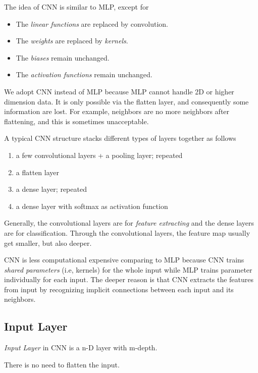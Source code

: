 \documentclass{note}
\begin{document}
The idea of CNN is similar to MLP, except for
\begin{itemize}
    \item The \textit{linear functions} are replaced by convolution.
    \item The \textit{weights} are replaced by \textit{kernels}.
    \item The \textit{biases} remain unchanged.
    \item The \textit{activation functions} remain unchanged.
\end{itemize}
We adopt CNN instead of MLP because MLP cannot handle 2D or higher dimension data. It is only possible via the flatten layer, and consequently some information are lost. For example, neighbors are no more neighbors after flattening, and this is sometimes unacceptable. 

A typical CNN structure stacks different types of layers together as follows
\begin{enumerate}
    \item a few convolutional layers + a pooling layer; repeated
    \item a flatten layer
    \item a dense layer; repeated
    \item a dense layer with softmax as activation function
\end{enumerate}

Generally, the convolutional layers are for \textit{feature extracting} and the dense layers are for classification. Through the convolutional layers, the feature map usually get smaller, but also deeper.

\begin{note}
    CNN is less computational expensive comparing to MLP because CNN trains \textit{shared parameters} (i.e, kernels) for the whole input while MLP trains parameter individually for each input. The deeper reason is that CNN extracts the features from input by recognizing implicit connections between each input and its neighbors.
\end{note}

\subsection{Input Layer}

\textit{Input Layer} in CNN is a n-D layer with m-depth. 

\begin{note}
    There is no need to flatten the input.
\end{note}
\end{document}
